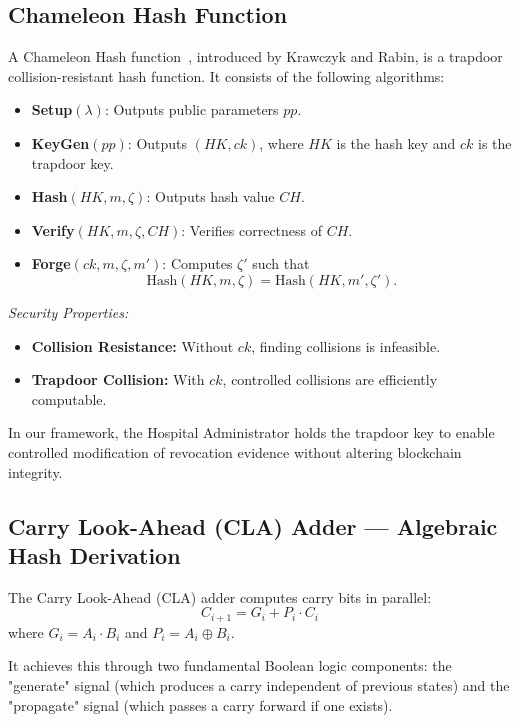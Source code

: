 \documentclass[conference]{IEEEtran}
\begin{document}
\subsection{Chameleon Hash Function}

A Chameleon Hash function~\cite{ref43}, introduced by Krawczyk and Rabin, is a trapdoor collision-resistant hash function. It consists of the following algorithms:

\begin{itemize}
\item \textbf{Setup}$(\lambda)$: Outputs public parameters $pp$.
\item \textbf{KeyGen}$(pp)$: Outputs $(HK, ck)$, where $HK$ is the hash key and $ck$ is the trapdoor key.
\item \textbf{Hash}$(HK, m, \zeta)$: Outputs hash value $CH$.
\item \textbf{Verify}$(HK, m, \zeta, CH)$: Verifies correctness of $CH$.
\item \textbf{Forge}$(ck, m, \zeta, m')$: Computes $\zeta'$ such that
\begin{equation}
\text{Hash}(HK, m, \zeta) = \text{Hash}(HK, m', \zeta').
\end{equation}
\end{itemize}

\textit{Security Properties:}
\begin{itemize}
\item \textbf{Collision Resistance:} Without $ck$, finding collisions is infeasible.
\item \textbf{Trapdoor Collision:} With $ck$, controlled collisions are efficiently computable.
\end{itemize}

In our framework, the Hospital Administrator holds the trapdoor key to enable controlled modification of revocation evidence without altering blockchain integrity.

\subsection{Carry Look-Ahead (CLA) Adder — Algebraic Hash Derivation}

The Carry Look-Ahead (CLA) adder computes carry bits in parallel:
\begin{equation}
C_{i+1} = G_i + P_i \cdot C_i
\end{equation}
where $G_i = A_i \cdot B_i$ and $P_i = A_i \oplus B_i$.


 It achieves this through two fundamental Boolean logic components: the "generate" signal (which produces a carry independent of previous states) and the "propagate" signal (which passes a carry forward if one exists).
\end{document}
